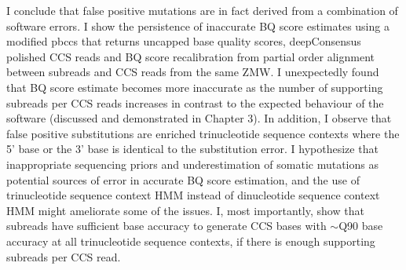 I conclude that false positive mutations are in fact derived from a combination of software errors. I show the persistence of inaccurate BQ score estimates using a modified pbccs that returns uncapped base quality scores, deepConsensus polished CCS reads and BQ score recalibration from partial order alignment between subreads and CCS reads from the same ZMW. I unexpectedly found that BQ score estimate becomes more inaccurate as the number of supporting subreads per CCS reads increases in contrast to the expected behaviour of the software (discussed and demonstrated in Chapter 3). In addition, I observe that false positive substitutions are enriched trinucleotide sequence contexts where the 5’ base or the 3’ base is identical to the substitution error. I hypothesize that inappropriate sequencing priors and underestimation of somatic mutations as potential sources of error in accurate BQ score estimation, and the use of trinucleotide sequence context HMM instead of dinucleotide sequence context HMM might ameliorate some of the issues. I, most importantly, show that subreads have sufficient base accuracy to generate CCS bases with $\sim$Q90 base accuracy at all trinucleotide sequence contexts, if there is enough supporting subreads per CCS read. 

